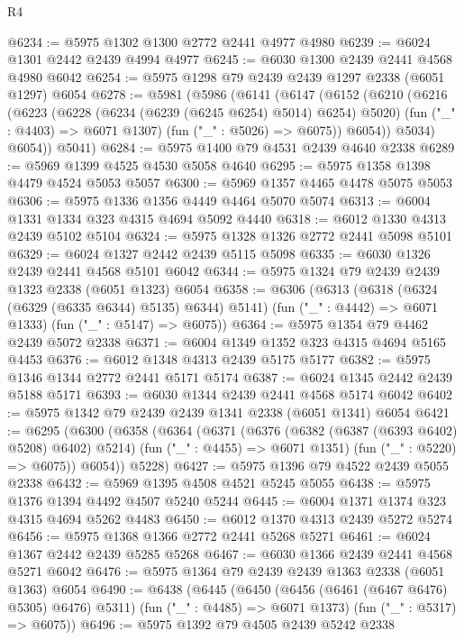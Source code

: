 \begin{lexlean}{R4}
\begin{coremodule}
@6234 := @5975 @1302 @1300 @2772 @2441 @4977 @4980
@6239 := @6024 @1301 @2442 @2439 @4994 @4977
@6245 := @6030 @1300 @2439 @2441 @4568 @4980 @6042
@6254 := @5975 @1298 @79 @2439 @2439 @1297 @2338 (@6051 @1297) @6054
@6278 := @5981
    (@5986
      (@6141
        (@6147
          (@6152
            (@6210
              (@6216
                (@6223
                  (@6228 (@6234 (@6239 (@6245 @6254) @5014) @6254) @5020)
                  (fun ("_" : @4403) => @6071 @1307)
                  (fun ("_" : @5026) => @6075))
                @6054))
            @5034)
          @6054))
      @5041)
@6284 := @5975 @1400 @79 @4531 @2439 @4640 @2338
@6289 := @5969 @1399 @4525 @4530 @5058 @4640
@6295 := @5975 @1358 @1398 @4479 @4524 @5053 @5057
@6300 := @5969 @1357 @4465 @4478 @5075 @5053
@6306 := @5975 @1336 @1356 @4449 @4464 @5070 @5074
@6313 := @6004 @1331 @1334 @323 @4315 @4694 @5092 @4440
@6318 := @6012 @1330 @4313 @2439 @5102 @5104
@6324 := @5975 @1328 @1326 @2772 @2441 @5098 @5101
@6329 := @6024 @1327 @2442 @2439 @5115 @5098
@6335 := @6030 @1326 @2439 @2441 @4568 @5101 @6042
@6344 := @5975 @1324 @79 @2439 @2439 @1323 @2338 (@6051 @1323) @6054
@6358 := @6306
    (@6313
      (@6318 (@6324 (@6329 (@6335 @6344) @5135) @6344) @5141)
      (fun ("_" : @4442) => @6071 @1333)
      (fun ("_" : @5147) => @6075))
@6364 := @5975 @1354 @79 @4462 @2439 @5072 @2338
@6371 := @6004 @1349 @1352 @323 @4315 @4694 @5165 @4453
@6376 := @6012 @1348 @4313 @2439 @5175 @5177
@6382 := @5975 @1346 @1344 @2772 @2441 @5171 @5174
@6387 := @6024 @1345 @2442 @2439 @5188 @5171
@6393 := @6030 @1344 @2439 @2441 @4568 @5174 @6042
@6402 := @5975 @1342 @79 @2439 @2439 @1341 @2338 (@6051 @1341) @6054
@6421 := @6295
    (@6300
      (@6358
        (@6364
          (@6371
            (@6376 (@6382 (@6387 (@6393 @6402) @5208) @6402) @5214)
            (fun ("_" : @4455) => @6071 @1351)
            (fun ("_" : @5220) => @6075))
          @6054))
      @5228)
@6427 := @5975 @1396 @79 @4522 @2439 @5055 @2338
@6432 := @5969 @1395 @4508 @4521 @5245 @5055
@6438 := @5975 @1376 @1394 @4492 @4507 @5240 @5244
@6445 := @6004 @1371 @1374 @323 @4315 @4694 @5262 @4483
@6450 := @6012 @1370 @4313 @2439 @5272 @5274
@6456 := @5975 @1368 @1366 @2772 @2441 @5268 @5271
@6461 := @6024 @1367 @2442 @2439 @5285 @5268
@6467 := @6030 @1366 @2439 @2441 @4568 @5271 @6042
@6476 := @5975 @1364 @79 @2439 @2439 @1363 @2338 (@6051 @1363) @6054
@6490 := @6438
    (@6445
      (@6450 (@6456 (@6461 (@6467 @6476) @5305) @6476) @5311)
      (fun ("_" : @4485) => @6071 @1373)
      (fun ("_" : @5317) => @6075))
@6496 := @5975 @1392 @79 @4505 @2439 @5242 @2338

\end{coremodule}
\end{lexlean}
